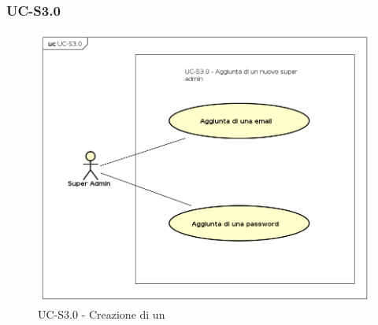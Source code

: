\subsubsection{UC-S3.0}
    \begin{figure}[H]
      \begin{center}
        \includegraphics[width=12cm]{res/img/UCSuperadmin/UC-S3.0.png}
      \caption{UC-S3.0 - Creazione di un }
      \end{center} 
    \end{figure}    
    
